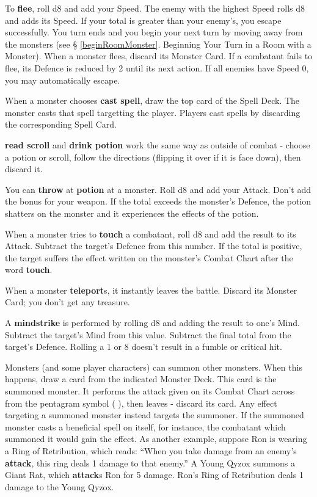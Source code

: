 \documentclass{book}
\begin{document}
To \textbf{flee}, roll d8 and add your Speed. The enemy with the highest Speed rolls d8 and adds its Speed. If your total is greater than your enemy’s, you escape successfully. You turn ends and you begin your next turn by moving away from the monsters (see § \ref{beginRoomMonster}. Beginning Your Turn in a Room with a Monster). When a monster flees, discard its Monster Card. If a combatant fails to flee, its Defence is reduced by 2 until its next action. If all enemies have Speed 0, you may automatically escape.

When a monster chooses \textbf{cast spell}, draw the top card of the Spell Deck. The monster casts that spell targetting the player. Players cast spells by discarding the corresponding Spell Card.

\textbf{read scroll} and \textbf{drink potion} work the same way as outside of combat - choose a potion or scroll,
follow the directions (flipping it over if it is face down), then discard it.

You can \textbf{throw} at \textbf{potion} at a monster. Roll d8 and add your Attack. Don’t add the bonus for your weapon. If the total exceeds the monster’s Defence, the potion shatters on the monster and it experiences the
effects of the potion.

When a monster tries to \textbf{touch} a combatant, roll d8 and add the result to its Attack. Subtract the target’s Defence from this number. If the total is positive, the target suffers the effect written on the monster’s Combat Chart after the word \textbf{touch}.

When a monster \textbf{teleport}s, it instantly leaves the battle. Discard its Monster Card; you don’t get any treasure.

A \textbf{mindstrike} is performed by rolling d8 and adding the result to one’s Mind. Subtract the target’s Mind from this value. Subtract the final total from the target’s Defence. Rolling a 1 or 8 doesn’t result in a fumble or critical hit.  

Monsters (and some player characters) can summon other monsters. When this happens, draw a card from the indicated Monster Deck. This card is the summoned monster. It performs the attack given on its Combat Chart across from the pentagram symbol ( ), then leaves - discard its card.
Any effect targeting a summoned monster instead targets the summoner. If the summoned monster casts a beneficial spell on itself, for instance, the combatant which summoned it would gain the effect. As another example, suppose Ron is wearing a Ring of Retribution, which reads: “When you take damage from an enemy’s \textbf{attack}, this ring deals 1 damage to that enemy.” A Young Qyzox summons a Giant Rat, which \textbf{attack}s Ron for 5 damage. Ron’s Ring of Retribution deals 1 damage to the Young Qyzox.
\end{document}

